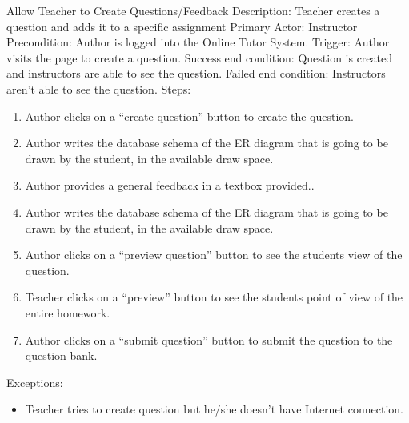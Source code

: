     \begin{section}{Allow Teacher to Create  Questions/Feedback}
        Description: Teacher creates a question and adds it to a specific assignment \newline
        Primary Actor: Instructor \newline
        Precondition: Author is logged into the Online Tutor System. \newline
        Trigger: Author visits the page to create a question. \newline
        Success end condition: Question is created and instructors are able to see the question. \newline
        Failed end condition: Instructors aren’t able to see the question. \newline
        \newline
        Steps:
        \begin{enumerate}
            \item{Author clicks on a “create question” button to create the question.}
            \item{Author writes the database schema of the ER diagram that is going to be drawn by the student, in the available draw space.}
            \item{Author provides a general feedback in a textbox provided..}
            \item{Author writes the database schema of the ER diagram that is going to be drawn by the student, in the available draw space.}
            \item{Author clicks on a “preview question” button to see the students view of the question.}
            \item{Teacher clicks on a “preview” button to see the           students point of view of the entire homework.}
            \item{Author clicks on a “submit question” button to submit the question to the question bank.}
        \end{enumerate}
        Exceptions:
        \begin{itemize}
            \item{Teacher tries to create question but he/she doesn't have Internet connection.}
        \end{itemize}
    \end{section}

